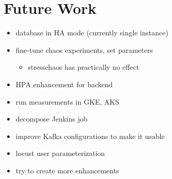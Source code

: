 \chapter{Future Work} \label{future-work}

\begin{itemize}
	\item database in HA mode (currently single instance)
	\item fine-tune chaos experiments, set parameters
	\begin{itemize}
		\item stresschaos has practically no effect
	\end{itemize}
	\item HPA enhancement for backend
	\item run measurements in GKE, AKS
	\item decompose Jenkins job
	\item improve Kafka configurations to make it usable
	\item locust user parameterization
	\item try to create more enhancements
\end{itemize}